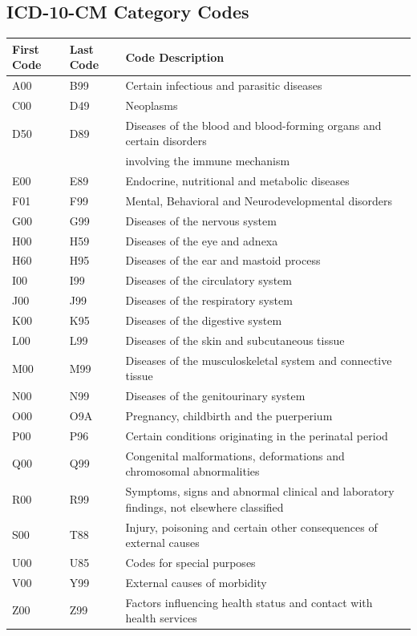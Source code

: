 \documentclass{bmcart}
\begin{document}
\begin{backmatter}
\subsection*{ICD-10-CM Category Codes}

\begin{table}[ht!]
\begin{tabular}{|l|l|l|}
\hline
First Code & Last Code & Code Description\\
\hline
A00 & B99 & Certain infectious and parasitic diseases\\
\hline
C00 & D49 & Neoplasms\\
\hline
D50 & D89 & Diseases of the blood and blood-forming organs and certain disorders \\
& & involving the immune mechanism\\
\hline
E00 & E89 & Endocrine, nutritional and metabolic diseases\\
\hline
F01 & F99 & Mental, Behavioral and Neurodevelopmental disorders\\
\hline
G00 & G99 & Diseases of the nervous system\\
\hline
H00 & H59 & Diseases of the eye and adnexa\\
\hline
H60 & H95 & Diseases of the ear and mastoid process\\
\hline
I00 & I99 & Diseases of the circulatory system\\
\hline
J00 & J99 & Diseases of the respiratory system\\
\hline
K00 & K95 & Diseases of the digestive system\\
\hline
L00 & L99 & Diseases of the skin and subcutaneous tissue\\
\hline
M00 & M99 & Diseases of the musculoskeletal system and connective tissue\\
\hline
N00 & N99 & Diseases of the genitourinary system\\
\hline
O00 & O9A & Pregnancy, childbirth and the puerperium\\
\hline
P00 & P96 & Certain conditions originating in the perinatal period\\
\hline
Q00 & Q99 & Congenital malformations, deformations and chromosomal abnormalities\\
\hline
R00 & R99 & Symptoms, signs and abnormal clinical and laboratory findings, not elsewhere classified\\
\hline
S00 & T88 & Injury, poisoning and certain other consequences of external causes\\
\hline
U00 & U85 & Codes for special purposes\\
\hline
V00 & Y99 & External causes of morbidity\\
\hline
Z00 & Z99 & Factors influencing health status and contact with health services\\
\hline
\end{tabular}
\end{table}




\end{backmatter}
\end{document}

